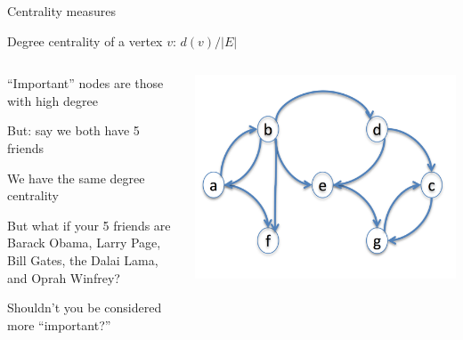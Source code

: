 \begin{frame}{Centrality measures}

\begin{definition}
\alert{Degree centrality} of a vertex $v$: $d(v)/|E|$
\end{definition}

\begin{columns}
	\begin{column}{0.5\textwidth}
		\BI
			\item “Important” nodes are those with high degree
			\item But: say we both have 5 friends
			\BI
			\item We have the same degree centrality
			\item But what if your 5 friends are Barack Obama, Larry Page, Bill Gates, the Dalai Lama, and Oprah Winfrey?
			\item Shouldn’t you be considered more “important?”
			\EI
		\EI
	\end{column}
	\begin{column}{0.5\textwidth}
		\includegraphics[width=\textwidth]{figs/xx/connectivity.png}
	\end{column}
\end{columns}

\end{frame}


